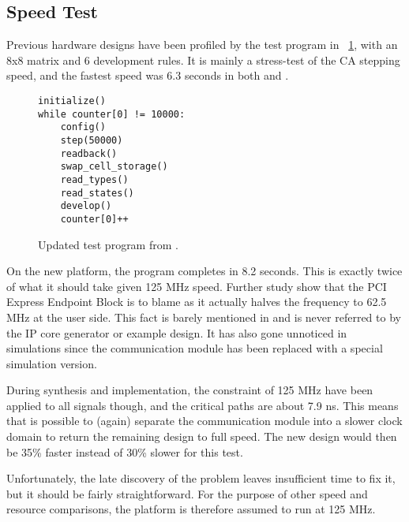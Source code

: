 
\subsection{Speed Test}

Previous hardware designs have been profiled by the test program in \figurename~\ref{fig:test-program}, with an 8x8 matrix and 6 development rules.
It is mainly a stress-test of the CA stepping speed, and the fastest speed was 6.3 seconds in both \cite{djupdal2003sblock} and \cite{stovneng2014sblock}.

\begin{figure}[!ht]
\begin{lstlisting}[xleftmargin=0.34\textwidth]
initialize()
while counter[0] != 10000:
    config()
    step(50000)
    readback()
    swap_cell_storage()
    read_types()
    read_states()
    develop()
    counter[0]++
\end{lstlisting}
\caption[Test program] {
    Updated test program from \cite{djupdal2003sblock}.
}
\label{fig:test-program}
\end{figure}

On the new platform, the program completes in 8.2 seconds.
This is exactly twice of what it should take given 125 MHz speed.
Further study show that the PCI Express Endpoint Block is to blame as it actually halves the frequency to 62.5 MHz at the user side.
This fact is barely mentioned in \cite{ug672} and is never referred to by the IP core generator or example design.
It has also gone unnoticed in simulations since the communication module has been replaced with a special simulation version.

During synthesis and implementation, the constraint of 125 MHz have been applied to all signals though, and the critical paths are about 7.9 ns.
This means that is possible to (again) separate the communication module into a slower clock domain to return the remaining design to full speed.
The new design would then be 35\% faster instead of 30\% slower for this test.

Unfortunately, the late discovery of the problem leaves insufficient time to fix it, but it should be fairly straightforward.
For the purpose of other speed and resource comparisons, the platform is therefore assumed to run at 125 MHz.


